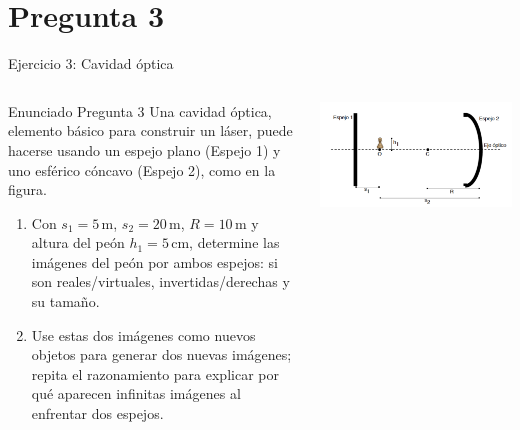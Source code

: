 \documentclass[
    10pt,
    aspectratio=169,
    xcolor={dvipsnames},
    spanish,
    ]{beamer}
\begin{document}
\section{Pregunta 3}
\begin{frame}{Ejercicio 3: Cavidad óptica}
  \footnotesize
  \begin{columns}[T,totalwidth=\textwidth]
    \begin{column}{0.55\textwidth}
      \begin{block}{Enunciado Pregunta 3}
        Una cavidad óptica, elemento básico para construir un láser, puede hacerse usando un espejo plano (Espejo 1) y uno esférico cóncavo (Espejo 2), como en la figura.
        \begin{enumerate}
          \item Con $s_1=5\,\mathrm{m}$, $s_2=20\,\mathrm{m}$, $R=10\,\mathrm{m}$ y altura del peón $h_1=5\,\mathrm{cm}$, determine las imágenes del peón por ambos espejos: si son reales/virtuales, invertidas/derechas y su tamaño.
          \item Use estas dos imágenes como nuevos objetos para generar dos nuevas imágenes; repita el razonamiento para explicar por qué aparecen infinitas imágenes al enfrentar dos espejos.
        \end{enumerate}
      \end{block}
    \end{column}
    \begin{column}{0.40\textwidth}
      \centering
  \vspace*{1cm}
      \includegraphics[width=1\textwidth]{Auxiliar_1_5 copy.png}
    \end{column}
  \end{columns}
\end{frame}
\end{document}

